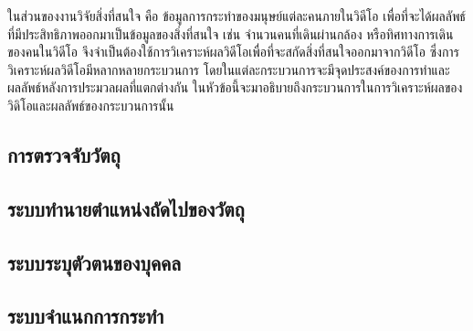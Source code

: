 ในส่วนของงานวิจัยสิ่งที่สนใจ คือ ข้อมูลการกระทำของมนุษย์แต่ละคนภายในวิดีโอ เพื่อที่จะได้ผลลัพธ์ที่มีประสิทธิภาพออกมาเป็นข้อมูลของสิ่งที่สนใจ เช่น จำนวนคนที่เดินผ่านกล้อง 
หรือทิศทางการเดินของคนในวิดีโอ จึงจำเป็นต้องใช้การวิเคราะห์ผลวิดีโอเพื่อที่จะสกัดสิ่งที่สนใจออกมาจากวิดีโอ ซึ่งการวิเคราะห์ผลวิดีโอมีหลากหลายกระบวนการ 
โดยในแต่ละกระบวนการจะมีจุดประสงค์ของการทำและผลลัพธ์หลังการประมวลผลที่แตกต่างกัน ในหัวข้อนี้จะมาอธิบายถึงกระบวนการในการวิเคราะห์ผลของวิดิโอและผลลัพธ์ของกระบวนการนั้น
\clearpage
\subsection{การตรวจจับวัตถุ}


\clearpage
\subsection{ระบบทำนายตำแหน่งถัดไปของวัตถุ}


\subsection{ระบบระบุตัวตนของบุคคล}


\subsection{ระบบจำแนกการกระทำ}
